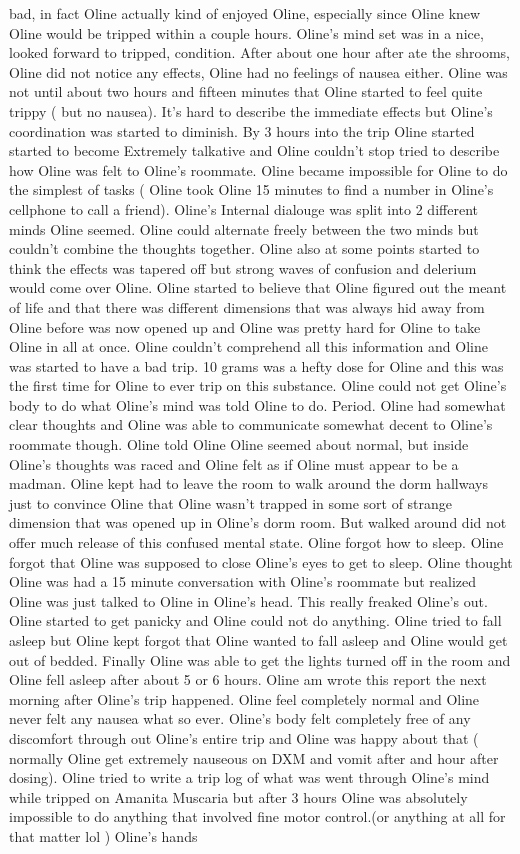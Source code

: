 \documentclass[12pt]{book}
\begin{document}
bad, in fact Oline actually kind of enjoyed Oline, especially since Oline knew Oline would be tripped within a couple hours. Oline's mind set was in a nice, looked forward to tripped, condition. After about one hour after ate the shrooms, Oline did not notice any effects, Oline had no feelings of nausea either. Oline was not until about two hours and fifteen minutes that Oline started to feel quite trippy ( but no nausea). It's hard to describe the immediate effects but Oline's coordination was started to diminish. By 3 hours into the trip Oline started started to become Extremely talkative and Oline couldn't stop tried to describe how Oline was felt to Oline's roommate. Oline became impossible for Oline to do the simplest of tasks ( Oline took Oline 15 minutes to find a number in Oline's cellphone to call a friend). Oline's Internal dialouge was split into 2 different minds Oline seemed. Oline could alternate freely between the two minds but couldn't combine the thoughts together. Oline also at some points started to think the effects was tapered off but strong waves of confusion and delerium would come over Oline. Oline started to believe that Oline figured out the meant of life and that there was different dimensions that was always hid away from Oline before was now opened up and Oline was pretty hard for Oline to take Oline in all at once. Oline couldn't comprehend all this information and Oline was started to have a bad trip. 10 grams was a hefty dose for Oline and this was the first time for Oline to ever trip on this substance. Oline could not get Oline's body to do what Oline's mind was told Oline to do. Period. Oline had somewhat clear thoughts and Oline was able to communicate somewhat decent to Oline's roommate though. Oline told Oline Oline seemed about normal, but inside Oline's thoughts was raced and Oline felt as if Oline must appear to be a madman. Oline kept had to leave the room to walk around the dorm hallways just to convince Oline that Oline wasn't trapped in some sort of strange dimension that was opened up in Oline's dorm room. But walked around did not offer much release of this confused mental state. Oline forgot how to sleep. Oline forgot that Oline was supposed to close Oline's eyes to get to sleep. Oline thought Oline was had a 15 minute conversation with Oline's roommate but realized Oline was just talked to Oline in Oline's head. This really freaked Oline's out. Oline started to get panicky and Oline could not do anything. Oline tried to fall asleep but Oline kept forgot that Oline wanted to fall asleep and Oline would get out of bedded. Finally Oline was able to get the lights turned off in the room and Oline fell asleep after about 5 or 6 hours. Oline am wrote this report the next morning after Oline's trip happened. Oline feel completely normal and Oline never felt any nausea what so ever. Oline's body felt completely free of any discomfort through out Oline's entire trip and Oline was happy about that ( normally Oline get extremely nauseous on DXM and vomit after and hour after dosing). Oline tried to write a trip log of what was went through Oline's mind while tripped on Amanita Muscaria but after 3 hours Oline was absolutely impossible to do anything that involved fine motor control.(or anything at all for that matter lol ) Oline's hands 
\end{document}
